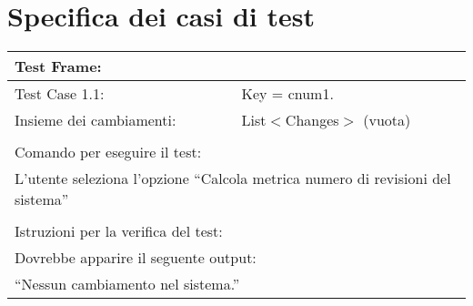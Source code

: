 \chapter{Specifica dei casi di test}

\begin{tabular}{ll}
\hline
\multicolumn{2}{l}{ \textbf{Test Frame:} }							\\
\hline
Test Case 1.1:				&	{Key = cnum1.}						\\
Insieme dei cambiamenti:	&	List$<$Changes$>$ (vuota)			\\
\multicolumn{2}{l}{ }												\\
\multicolumn{2}{l}{ Comando per eseguire il test: }					\\
\multicolumn{2}{l}{ L'utente seleziona l'opzione ``Calcola metrica numero di revisioni del sistema'' }			\\
\multicolumn{2}{l}{ }												\\
\multicolumn{2}{l}{ Istruzioni per la verifica del test: }			\\
\multicolumn{2}{l}{ Dovrebbe apparire il seguente output: }			\\
\multicolumn{2}{l}{ ``Nessun cambiamento nel sistema.'' }			\\
\hline
\end{tabular}

\clearpage

